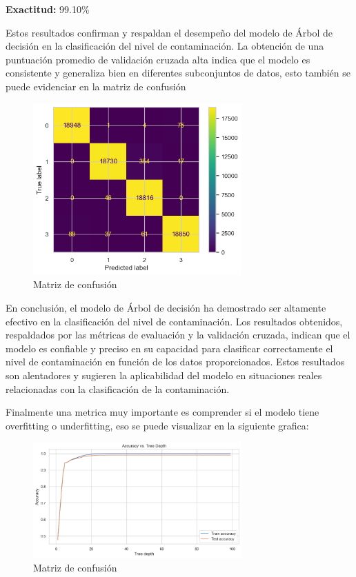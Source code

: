 \textbf{Exactitud:} 99.10\%

Estos resultados confirman y respaldan el desempeño del modelo de Árbol de decisión en la clasificación del nivel de contaminación. La obtención de una puntuación promedio de validación cruzada alta indica que el modelo es consistente y generaliza bien en diferentes subconjuntos de datos, esto también se puede evidenciar en la matriz de confusión\\ 
\begin{figure}[htb] 
    \begin{center} 
        \includegraphics[width=8cm]{Papper IB/Images/model_3.png}
    \end{center} 
    \caption{Matriz de confusión} 
    \label{fig:fig2} 
\end{figure} 


En conclusión, el modelo de Árbol de decisión ha demostrado ser altamente efectivo en la clasificación del nivel de contaminación. Los resultados obtenidos, respaldados por las métricas de evaluación y la validación cruzada, indican que el modelo es confiable y preciso en su capacidad para clasificar correctamente el nivel de contaminación en función de los datos proporcionados. Estos resultados son alentadores y sugieren la aplicabilidad del modelo en situaciones reales relacionadas con la clasificación de la contaminación.\cite{li2017study}

Finalmente una metrica muy importante es comprender si el modelo tiene overfitting o underfitting, eso se puede visualizar en la siguiente grafica: 
\begin{figure}[htb] 
    \begin{center} 
        \includegraphics[width=8cm]{Papper IB/Images/model_4.png}
    \end{center} 
    \caption{Matriz de confusión} 
    \label{fig:fig1} 
\end{figure} 

